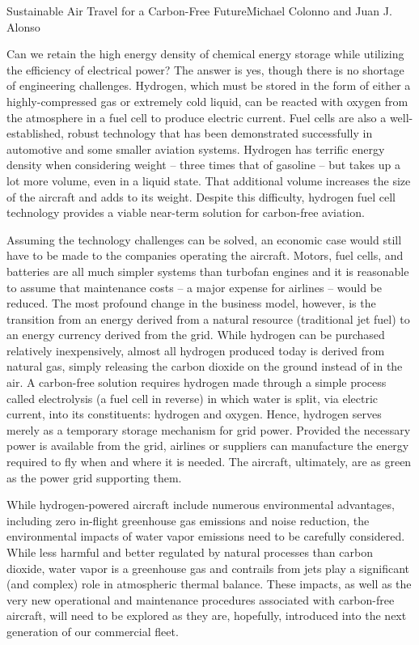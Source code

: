 \documentclass{papertex}
\begin{document}
\begin{news}{2}{Sustainable Air Travel for a Carbon-Free Future}{Michael Colonno and Juan J. Alonso}{}{}

Can we retain the high energy density of chemical energy storage while 
utilizing the efficiency of electrical power? The answer is yes, though there 
is no shortage of engineering challenges. Hydrogen, which must be stored in 
the form of either a highly-compressed gas or extremely cold liquid, can be 
reacted with oxygen from the atmosphere in a fuel cell to produce electric 
current. Fuel cells are also a well-established, robust technology that has 
been demonstrated successfully in automotive and some smaller aviation systems. 
Hydrogen has terrific energy density when considering weight – three times 
that of gasoline – but takes up a lot more volume, even in a liquid state. 
That additional volume increases the size of the aircraft and adds to its 
weight. Despite this difficulty, hydrogen fuel cell technology provides a 
viable near-term solution for carbon-free aviation.

Assuming the technology challenges can be solved, an economic case would 
still have to be made to the companies operating the aircraft. Motors, fuel 
cells, and batteries are all much simpler systems than turbofan engines and 
it is reasonable to assume that maintenance costs – a major expense for 
airlines – would be reduced. The most profound change in the business model, 
however, is the transition from an energy derived from a natural resource 
(traditional jet fuel) to an energy currency derived from the grid. While 
hydrogen can be purchased relatively inexpensively, almost all hydrogen 
produced today is derived from natural gas, simply releasing the carbon 
dioxide on the ground instead of in the air. A carbon-free solution requires 
hydrogen made through a simple process called electrolysis (a fuel cell in 
reverse) in which water is split, via electric current, into its constituents: 
hydrogen and oxygen. Hence, hydrogen serves merely as a temporary storage 
mechanism for grid power. Provided the necessary power is available from the 
grid, airlines or suppliers can manufacture the energy required to fly when 
and where it is needed. The aircraft, ultimately, are as green as the power 
grid supporting them.

While hydrogen-powered aircraft include numerous environmental advantages, 
including zero in-flight greenhouse gas emissions and noise reduction, the 
environmental impacts of water vapor emissions need to be carefully considered. 
While less harmful and better regulated by natural processes than carbon 
dioxide, water vapor is a greenhouse gas and contrails from jets play a 
significant (and complex) role in atmospheric thermal balance. These impacts, 
as well as the very new operational and maintenance procedures associated 
with carbon-free aircraft, will need to be explored as they are, hopefully, 
introduced into the next generation of our commercial fleet.


\end{news}
\end{document}
